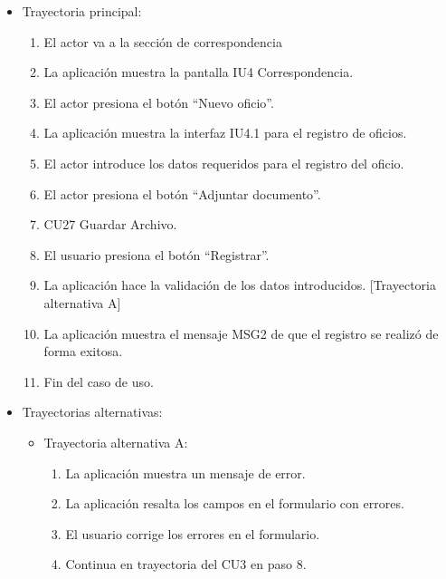 \begin{itemize}
	\item Trayectoria principal:
	\begin{enumerate}
		\item El actor va a la sección de correspondencia 
		\item La aplicación muestra la pantalla IU4 Correspondencia.
		\item El actor presiona el botón “Nuevo oficio”.
		\item La aplicación muestra la interfaz IU4.1 para el registro de oficios.
		\item El actor introduce los datos requeridos para el registro del oficio.
		\item El actor presiona el botón “Adjuntar documento”.
		\item CU27 Guardar Archivo.
		\item El usuario presiona el botón “Registrar”. 
		\item La aplicación hace la validación de los datos introducidos. [Trayectoria alternativa A] 
		\item La aplicación muestra el mensaje MSG2 de que el registro se realizó de forma exitosa.
		\item Fin del caso de uso.
	\end{enumerate}
	
	\item Trayectorias alternativas:
	\begin{itemize}
		\item Trayectoria alternativa A:
			\begin{enumerate}
				\item La aplicación muestra un mensaje de error.
				\item La aplicación resalta los campos en el formulario con errores.
				\item El usuario corrige los errores en el formulario.
				\item Continua en trayectoria del CU3 en paso 8.
			\end{enumerate}
	\end{itemize}
\end{itemize}

